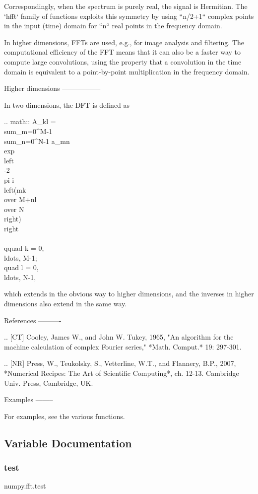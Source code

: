 \begin{DoxyVerb}
Correspondingly, when the spectrum is purely real, the signal is
Hermitian.  The `hfft` family of functions exploits this symmetry by
using ``n/2+1`` complex points in the input (time) domain for ``n`` real
points in the frequency domain.

In higher dimensions, FFTs are used, e.g., for image analysis and
filtering.  The computational efficiency of the FFT means that it can
also be a faster way to compute large convolutions, using the property
that a convolution in the time domain is equivalent to a point-by-point
multiplication in the frequency domain.

Higher dimensions
-----------------

In two dimensions, the DFT is defined as

.. math::
   A_{kl} =  \\sum_{m=0}^{M-1} \\sum_{n=0}^{N-1}
   a_{mn}\\exp\\left\\{-2\\pi i \\left({mk\\over M}+{nl\\over N}\\right)\\right\\}
   \\qquad k = 0, \\ldots, M-1;\\quad l = 0, \\ldots, N-1,

which extends in the obvious way to higher dimensions, and the inverses
in higher dimensions also extend in the same way.

References
----------

.. [CT] Cooley, James W., and John W. Tukey, 1965, "An algorithm for the
    machine calculation of complex Fourier series," *Math. Comput.*
    19: 297-301.

.. [NR] Press, W., Teukolsky, S., Vetterline, W.T., and Flannery, B.P.,
    2007, *Numerical Recipes: The Art of Scientific Computing*, ch.
    12-13.  Cambridge Univ. Press, Cambridge, UK.

Examples
--------

For examples, see the various functions.\end{DoxyVerb}
 

\subsection{Variable Documentation}
\mbox{\label{namespacenumpy_1_1fft_ad7324baa30d876111354e55fa02a3a56}} 
\subsubsection{\texorpdfstring{test}{test}}
{\footnotesize\ttfamily numpy.\+fft.\+test}

